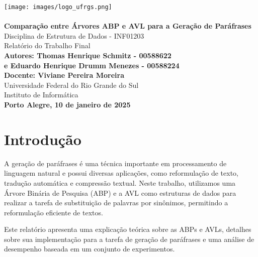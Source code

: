 \documentclass[a4paper, 12pt, english]{article}
\begin{document}
\begin{titlepage}
\begin{center}

\texttt{[image: images/logo\_ufrgs.png]}\\[1cm]
\vspace{20pt}
\textbf{}\\[1.5cm]

{\Huge \textbf{ Comparação entre Árvores ABP e AVL para a Geração de Paráfrases}}\\[1.5cm]
Disciplina de Estrutura de Dados - INF01203 \\[2mm]
{\Large Relatório do Trabalho Final}\\[20mm]

\textbf{Autores: Thomas Henrique Schmitz - 00588622}\\
\textbf{e Eduardo Henrique Drumm Menezes - 00588224}\\
\textbf{Docente: Viviane Pereira Moreira}\\[1cm]
Universidade Federal do Rio Grande do Sul\\
Instituto de Informática\\[1cm]

\vfill
\textbf{Porto Alegre, 10 de janeiro de 2025}\\

\end{center}
\end{titlepage}


 \newpage

\tableofcontents
\newpage

\section{Introdução}
A geração de paráfrases é uma técnica importante em processamento de linguagem natural e possui diversas aplicações, como reformulação de texto, tradução automática e compressão textual. Neste trabalho, utilizamos uma Árvore Binária de Pesquisa (ABP) e a AVL como estruturas de dados para realizar a tarefa de substituição de palavras por sinônimos, permitindo a reformulação eficiente de textos.

Este relatório apresenta uma explicação teórica sobre as ABPs e AVLs, detalhes sobre sua implementação para a tarefa de geração de paráfrases e uma análise de desempenho baseada em um conjunto de experimentos.
\end{document}

